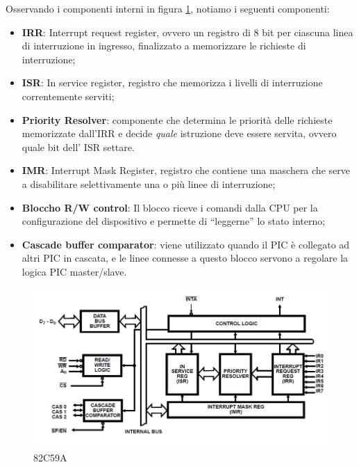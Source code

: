 Osservando i componenti interni in figura \ref{img:82C59A}, notiamo i seguenti componenti:
\begin{itemize}
    \item \textbf{IRR}: Interrupt request register, ovvero un registro di 8 bit per ciascuna linea di interruzione in ingresso, finalizzato a memorizzare le richieste di interruzione;
    \item \textbf{ISR}: In service register, registro che memorizza i livelli di interruzione correntemente serviti;
    \item \textbf{Priority Resolver}: componente che determina le priorità delle richieste memorizzate dall'IRR e decide \textit{quale} istruzione deve essere servita, ovvero quale bit dell' ISR settare.
    \item \textbf{IMR}: Interrupt Mask Register, registro che contiene una maschera che serve a disabilitare selettivamente una o più linee di interruzione;
    \item \textbf{Bloccho R/W control}: Il blocco riceve i comandi dalla CPU per la configurazione del dispositivo e permette di “leggerne” lo stato interno;
    \item \textbf{Cascade buffer comparator}: viene utilizzato quando il PIC è collegato ad altri PIC in cascata, e le linee connesse a questo blocco servono a regolare la logica PIC master/slave.
\end{itemize}

\begin{figure}[h!]
    \centering
    \includegraphics[width=1\textwidth]{img/PIC_82C59A.png}
    \caption{82C59A}
    \label{img:82C59A}
\end{figure}

